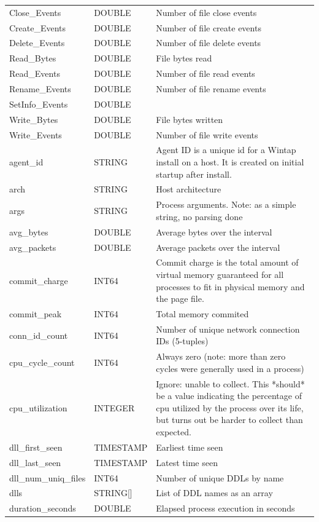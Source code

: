 \documentclass[conference,compsoc]{IEEEtran}
\begin{document}
\begin{longtable}{|p{5cm}|p{2cm}|p{9cm}|}
Close\_Events & DOUBLE & Number of file close events \\
Create\_Events & DOUBLE & Number of file create events \\
Delete\_Events & DOUBLE & Number of file delete events \\
Read\_Bytes & DOUBLE & File bytes read \\
Read\_Events & DOUBLE & Number of file read events \\
Rename\_Events & DOUBLE & Number of file rename events \\
SetInfo\_Events & DOUBLE &  \\
Write\_Bytes & DOUBLE & File bytes written \\
Write\_Events & DOUBLE & Number of file write events \\
agent\_id & STRING & Agent ID is a unique id for a Wintap install on a host. It is created on initial startup after install. \\
arch & STRING & Host architecture \\
args & STRING & Process arguments. Note: as a simple string, no parsing done \\
avg\_bytes & DOUBLE & Average bytes over the interval \\
avg\_packets & DOUBLE & Average packets over the interval \\
commit\_charge & INT64 & Commit charge is the total amount of virtual memory guaranteed for all processes to fit in physical memory and the page file. \\
commit\_peak & INT64 & Total memory commited \\
conn\_id\_count & INT64 & Number of unique network connection IDs (5-tuples) \\
cpu\_cycle\_count & INT64 & Always zero (note: more than zero cycles were generally used in a process) \\
cpu\_utilization & INTEGER & Ignore: unable to collect. This *should* be a value indicating the percentage of cpu utilized by the process over its life, but turns out be harder to collect than expected. \\
dll\_first\_seen & TIMESTAMP & Earliest time seen \\
dll\_last\_seen & TIMESTAMP & Latest time seen \\
dll\_num\_uniq\_files & INT64 & Number of unique DDLs by name \\
dlls & STRING[] & List of DDL names as an array \\
duration\_seconds & DOUBLE & Elapsed process execution in seconds \\

\end{longtable}
\end{document}
